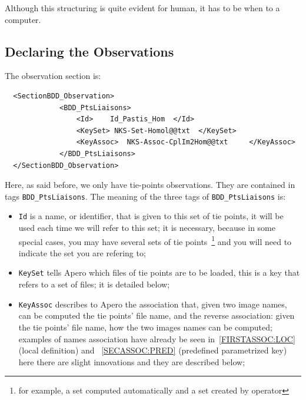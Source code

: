 Although this structuring is quite evident for human, it has
to be  when  to a computer.

\subsection{Declaring the Observations}

The  observation section is:

{\scriptsize
\begin{verbatim}
  <SectionBDD_Observation>
             <BDD_PtsLiaisons>
                 <Id>    Id_Pastis_Hom  </Id>
                 <KeySet> NKS-Set-Homol@@txt  </KeySet>
                 <KeyAssoc>  NKS-Assoc-CplIm2Hom@@txt     </KeyAssoc>
             </BDD_PtsLiaisons>
  </SectionBDD_Observation>

\end{verbatim}
}

Here, as said before, we only have tie-points observations.
They are contained in tags  {\tt BDD\_PtsLiaisons}.
The meaning of the three tags of  {\tt BDD\_PtsLiaisons} is:

\begin{itemize}
    \item {\tt Id} is a name, or identifier, that is given to this set
          of tie points, it will be used each time we will refer to this set;
          it is necessary, because in some special cases, you may have several
          sets of tie points~\footnote{for example, a set computed automatically
          and a set created by operator} and you will need to indicate the set
          you are refering to;

    \item  {\tt KeySet} tells Apero  which files of tie points are to be
           loaded, this is a key that refers to a set of files;
           it is detailed below;

    \item  {\tt KeyAssoc} describes to Apero the association that, given
           two image names, can be computed the tie points' file name, and the reverse
           association: given the tie points' file name, how the two images names can be computed;
           examples of names association have already be seen in~\ref{FIRSTASSOC:LOC} (local definition)
            and ~\ref{SECASSOC:PRED} (predefined parametrized key)
           here there are slight innovations and they are described below;
\end{itemize}

